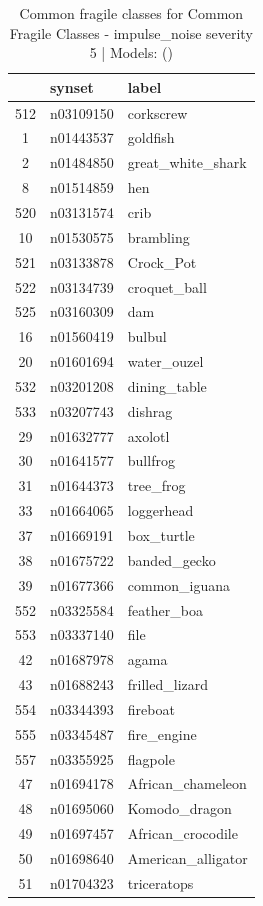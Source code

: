 \begin{table}
\caption{Common fragile classes for Common Fragile Classes - impulse_noise severity 5 | Models: ()}
\label{tab:Common Fragile Classes - impulse_noise severity 5_d41d8cd9}
\begin{tabular}{cll}
\toprule
 & synset & label \\
\midrule
512 & n03109150 & corkscrew \\
1 & n01443537 & goldfish \\
2 & n01484850 & great_white_shark \\
8 & n01514859 & hen \\
520 & n03131574 & crib \\
10 & n01530575 & brambling \\
521 & n03133878 & Crock_Pot \\
522 & n03134739 & croquet_ball \\
525 & n03160309 & dam \\
16 & n01560419 & bulbul \\
20 & n01601694 & water_ouzel \\
532 & n03201208 & dining_table \\
533 & n03207743 & dishrag \\
29 & n01632777 & axolotl \\
30 & n01641577 & bullfrog \\
31 & n01644373 & tree_frog \\
33 & n01664065 & loggerhead \\
37 & n01669191 & box_turtle \\
38 & n01675722 & banded_gecko \\
39 & n01677366 & common_iguana \\
552 & n03325584 & feather_boa \\
553 & n03337140 & file \\
42 & n01687978 & agama \\
43 & n01688243 & frilled_lizard \\
554 & n03344393 & fireboat \\
555 & n03345487 & fire_engine \\
557 & n03355925 & flagpole \\
47 & n01694178 & African_chameleon \\
48 & n01695060 & Komodo_dragon \\
49 & n01697457 & African_crocodile \\
50 & n01698640 & American_alligator \\
51 & n01704323 & triceratops \\

\end{tabular}
\end{table}
